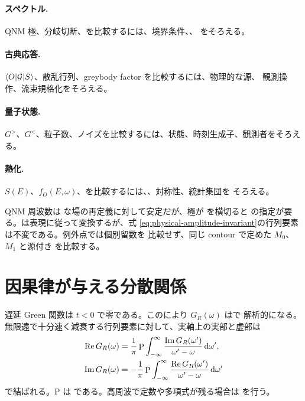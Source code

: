 \paragraph{スペクトル.}
QNM 極、分岐切断、を比較するには、境界条件、、
をそろえる。

\paragraph{古典応答.}
$\langle O \rvert\mathcal{G}\lvert S \rangle$、散乱行列、greybody factor を比較するには、物理的な源、
観測操作、流束規格化をそろえる。

\paragraph{量子状態.}
$G^>$、$G^<$、粒子数、ノイズを比較するには、状態、時刻生成子、観測者をそろえる。

\paragraph{熱化.}
$S(E)$、$f_O(E,\omega)$、を比較するには、、対称性、統計集団を
そろえる。

QNM 周波数は  な場の再定義に対して安定だが、極が  を横切ると
 の指定が要る。は表現に従って変換するが、式
\eqref{eq:physical-amplitude-invariant}の行列要素は不変である。例外点では個別留数を
比較せず、同じ contour で定めた $M_0$、$M_1$ と源付き を比較する。

\section{因果律が与える分散関係}

遅延 Green 関数は $t<0$ で零である。このにより $G_R(\omega)$ はで
解析的になる。無限遠で十分速く減衰する行列要素に対して、実軸上の実部と虚部は
\begin{align}
\operatorname{Re} G_R(\omega)
&=
\frac{1}{\pi}
\mathop{\mathrm{P}}
\int_{-\infty}^{\infty}
\frac{\operatorname{Im} G_R(\omega')}{\omega'-\omega}
\,\mathrm{d}\omega',
\label{eq:kramers-kronig-real}
\\
\operatorname{Im} G_R(\omega)
&=
-\frac{1}{\pi}
\mathop{\mathrm{P}}
\int_{-\infty}^{\infty}
\frac{\operatorname{Re} G_R(\omega')}{\omega'-\omega}
\,\mathrm{d}\omega'
\label{eq:kramers-kronig-imag}
\end{align}
で結ばれる。$\mathrm P$ は である。高周波で定数や多項式が残る場合は
 を行う。

